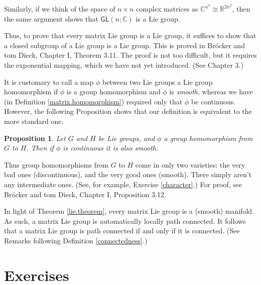 \documentclass[12pt]{amsbook}
\theoremstyle{plain}
\newtheorem{proposition}[theorem]{Proposition}
\numberwithin{equation}{chapter}
\numberwithin{theorem}{chapter}
\begin{document}
Similarly, if we think of the space of $n\times n$ complex matrices as
$\mathbb{C}^{n^{2}}\cong\mathbb{R}^{2n^{2}}$, then the same argument shows
that $\mathsf{GL}(n;\mathbb{C})$ is a Lie group.

Thus, to prove that every matrix Lie group is a Lie group, it suffices to show
that a closed subgroup of a Lie group is a Lie group. This is proved in
Br\"ocker and tom Dieck, Chapter I, Theorem 3.11. The proof is not too
difficult, but it requires the exponential mapping, which we have not yet
introduced. (See Chapter 3.)

It is customary to call a map $\phi$ between two Lie groups a Lie group
homomorphism if $\phi$ is a group homomorphism and $\phi$ is \textit{smooth},
whereas we have (in Definition \ref{matrix.homomorphism}) required only that
$\phi$ be continuous. However, the following Proposition shows that our
definition is equivalent to the more standard one.

\begin{proposition}
\label{homo.smooth}Let $G$ and $H$ be Lie groups, and $\phi$ a group
homomorphism from $G$ to $H$. Then if $\phi$ is continuous it is also smooth.
\end{proposition}

Thus group homomorphisms from $G$ to $H$ come in only two varieties: the very
bad ones (discontinuous), and the very good ones (smooth). There simply aren't
any intermediate ones. (See, for example, Exercise \ref{character}.) For
proof, see Br\"ocker and tom Dieck, Chapter I, Proposition 3.12.

In light of Theorem \ref{lie.theorem}, every matrix Lie group is a (smooth)
manifold. As such, a matrix Lie group is automatically locally path connected.
It follows that a matrix Lie group is path connected if and only if it is
connected. (See Remarks following Definition \ref{connectedness}.)

\section{Exercises}
\end{document}
